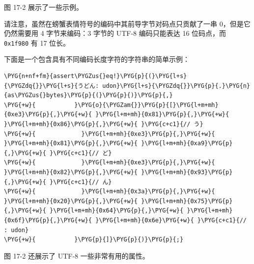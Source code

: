 图 17-2 展示了一些示例。


请注意，虽然在螃蟹表情符号的编码中其前导字节对码点只贡献了一串 0，但是它仍然需要用 4 字节来编码：3 字节的 UTF-8 编码只能表达 16 位码点，而 \texttt{0x1f980} 有 17 位长。

下面是一个包含具有不同编码长度字符的字符串的简单示例：

\begin{Verbatim}[commandchars=\\\{\},breaklines=true,breakanywhere=true,fontsize=\codefont,xleftmargin=17bp]
\PYG{n+nf+fm}{assert\PYGZus{}eq!}\PYG{p}{(}\PYG{l+s}{\PYGZdq{}}\PYG{l+s}{うどん: udon}\PYG{l+s}{\PYGZdq{}}\PYG{p}{.}\PYG{n}{as\PYGZus{}bytes}\PYG{p}{(}\PYG{p}{)}\PYG{p}{,}
\PYG{+w}{           }\PYG{o}{\PYGZam{}}\PYG{p}{[}\PYG{l+m+mh}{0xe3}\PYG{p}{,}\PYG{+w}{ }\PYG{l+m+mh}{0x81}\PYG{p}{,}\PYG{+w}{ }\PYG{l+m+mh}{0x86}\PYG{p}{,}\PYG{+w}{ }\PYG{c+c1}{// う}
\PYG{+w}{             }\PYG{l+m+mh}{0xe3}\PYG{p}{,}\PYG{+w}{ }\PYG{l+m+mh}{0x81}\PYG{p}{,}\PYG{+w}{ }\PYG{l+m+mh}{0xa9}\PYG{p}{,}\PYG{+w}{ }\PYG{c+c1}{// ど}
\PYG{+w}{             }\PYG{l+m+mh}{0xe3}\PYG{p}{,}\PYG{+w}{ }\PYG{l+m+mh}{0x82}\PYG{p}{,}\PYG{+w}{ }\PYG{l+m+mh}{0x93}\PYG{p}{,}\PYG{+w}{ }\PYG{c+c1}{// ん}
\PYG{+w}{             }\PYG{l+m+mh}{0x3a}\PYG{p}{,}\PYG{+w}{ }\PYG{l+m+mh}{0x20}\PYG{p}{,}\PYG{+w}{ }\PYG{l+m+mh}{0x75}\PYG{p}{,}\PYG{+w}{ }\PYG{l+m+mh}{0x64}\PYG{p}{,}\PYG{+w}{ }\PYG{l+m+mh}{0x6f}\PYG{p}{,}\PYG{+w}{ }\PYG{l+m+mh}{0x6e}\PYG{+w}{ }\PYG{c+c1}{// : udon}
\PYG{+w}{           }\PYG{p}{]}\PYG{p}{)}\PYG{p}{;}
\end{Verbatim}

图 17-2 还展示了 UTF-8 一些非常有用的属性。

